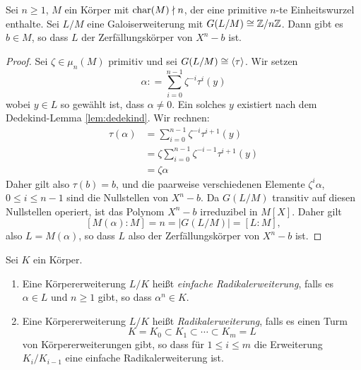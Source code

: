 \documentclass{book}
\begin{document}
\begin{thm}
    \label{thm:radikalzyklisch}
    Sei $n \ge 1$, $M$ ein Körper mit $\operatorname{char}(M) \nmid n$, der eine primitive
    $n$-te Einheitswurzel enthalte. Sei $L/M$ eine Galoiserweiterung mit
    $G(L/M) \cong \mathbb{Z}/n\mathbb{Z}$. Dann gibt es $b \in M$, so dass $L$ der
    Zerfällungskörper von $X^n - b$ ist. 
\end{thm}
\begin{proof}
    Sei $\zeta \in \mu_n(M)$ primitiv und sei $G(L/M) \cong \langle \tau \rangle$. Wir
    setzen 
    \[
        \alpha : = \sum_{i = 0}^{n-1} \zeta^{-i} \tau^i(y)
    \]
    wobei $y \in L$ so gewählt ist, dass $\alpha \ne 0$. Ein solches $y$
    existiert nach dem Dedekind-Lemma \ref{lem:dedekind}. Wir rechnen:
    \begin{align*}
        \tau(\alpha) & = \sum_{i = 0}^{n-1} \zeta^{-i} \tau^{i+1}(y)\\ 
                     & = \zeta \sum_{i = 0}^{n-1} \zeta^{-i-1} \tau^{i+1}(y)\\
                     & = \zeta \alpha
    \end{align*}
    Daher gilt also $\tau(b) = b$, und die paarweise verschiedenen Elemente
    $\zeta^i\alpha$, $0 \le i \le n-1$ sind die Nullstellen von $X^n - b$. Da
    $G(L/M)$ transitiv auf diesen Nullstellen operiert, ist das Polynom $X^n -
    b$ irreduzibel in $M[X]$. Daher gilt
    \[
        [M(\alpha):M] = n = |G(L/M)| = [L:M],
    \]
    also $L = M(\alpha)$, so dass $L$ also der Zerfällungskörper von $X^n - b$ ist. 
\end{proof}

\begin{defi}
    \label{defi:radikal}
    Sei $K$ ein Körper. 
    \begin{enumerate}
        \item Eine Körpererweiterung $L/K$ heißt {\em einfache
            Radikalerweiterung}, falls es $\alpha \in L$ und $n \ge 1$ gibt, so
            dass $\alpha^n \in K$. 
        \item Eine Körpererweiterung $L/K$ heißt {\em Radikalerweiterung}, falls es einen Turm
            \[
                K = K_0 \subset K_1 \subset \cdots \subset K_m = L
            \]
            von Körpererweiterungen gibt, so dass für $1 \le i \le m$ die
            Erweiterung $K_i/K_{i-1}$ eine einfache Radikalerweiterung ist. 
    \end{enumerate}
\end{defi}
\end{document}
